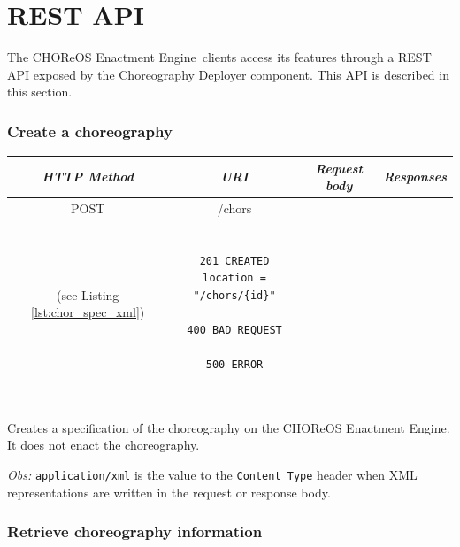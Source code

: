 \documentclass[a4paper, 10pt]{article}
\newcommand{\ee}{CHOReOS Enactment Engine}
\begin{document}
\section{REST API}
\label{sec:api}

The \ee\ clients access its features through a REST API exposed by the Choreography Deployer component. This API is described in this section.

\subsubsection*{Create a choreography}

\begin{tabular}{|c|c|c|c|}
\hline 
\itshape{HTTP Method} & \itshape{URI} & \itshape{Request body} & \itshape{Responses} \\ 
\hline 
POST & /chors & 

\begin{minipage}{2in}
\verb!ChorSpec! XML representation \\ 
(see Listing \ref{lst:chor_spec_xml})
\end{minipage} 
&

\begin{minipage}{2in}
\begin{verbatim}

201 CREATED
location = "/chors/{id}"

400 BAD REQUEST

500 ERROR

\end{verbatim}
\end{minipage} 
\\ 
\hline 
\end{tabular} \\

Creates a specification of the choreography on the \ee.
It does not enact the choreography. 

\emph{Obs:} \texttt{application/xml} is the value to the \texttt{Content Type} header when XML representations are written in the request or response body. 

\subsubsection*{Retrieve choreography information}
\end{document}
